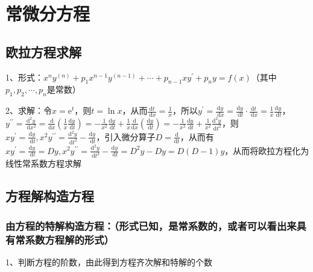 \chapter{常微分方程}

\section{欧拉方程求解}

1、形式：$ x^{n} y^{(n)}+p_{1} x^{n-1} y^{(n-1)}+\cdots+p_{n-1} x y^{\prime}+p_{n} y=f(x) $（其中$ p_{1}, p_{2}, \cdots, p_{n} $是常数）

2、求解：令$ x=\mathrm{e}^{t} $，则$ t=\ln x $，从而$ \frac{\mathrm{d} t}{\mathrm{~d} x}=\frac{1}{x} $，所以$ y^{\prime} =\frac{\mathrm{d} y}{\mathrm{~d} x}=\frac{\mathrm{d} y}{\mathrm{~d} t} \cdot \frac{\mathrm{d} t}{\mathrm{~d} x}=\frac{1}{x} \frac{\mathrm{d} y}{\mathrm{~d} t} $，$ y^{\prime \prime} =\frac{\mathrm{d}^{2} y}{\mathrm{~d} x^{2}}=\frac{\mathrm{d}}{\mathrm{d} x}\left(\frac{1}{x} \frac{\mathrm{d} y}{\mathrm{~d} t}\right)=-\frac{1}{x^{2}} \frac{\mathrm{d} y}{\mathrm{~d} t}+\frac{1}{x} \frac{\mathrm{d}}{\mathrm{d} x}\left(\frac{\mathrm{d} y}{\mathrm{~d} t}\right) =-\frac{1}{x^{2}} \frac{\mathrm{d} y}{\mathrm{~d} t}+\frac{1}{x^{2}} \frac{\mathrm{d}^{2} y}{\mathrm{~d} t^{2}} $，则$ x y^{\prime}=\frac{\mathrm{d} y}{\mathrm{~d} t}, x^{2} y^{\prime \prime}=\frac{\mathrm{d}^{2} y}{\mathrm{~d} t^{2}}-\frac{\mathrm{d} y}{\mathrm{~d} t} $，引入微分算子$ D=\frac{\mathrm{d}}{\mathrm{d} t} $，从而有$ x y^{\prime}=\frac{\mathrm{d} y}{\mathrm{~d} t}=D y, x^{2} y^{\prime \prime}=\frac{\mathrm{d}^{2} y}{\mathrm{~d} t^{2}}-\frac{\mathrm{d} y}{\mathrm{~d} t}=D^{2} y-D y=D(D-1) y $，从而将欧拉方程化为线性常系数方程求解

\section{方程解构造方程}



\subsection{由方程的特解构造方程：（形式已知，是常系数的，或者可以看出来具有常系数方程解的形式）}

1、判断方程的阶数，由此得到方程齐次解和特解的个数

